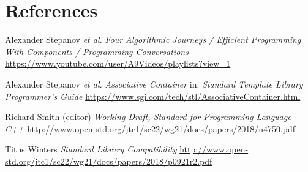 \documentclass[11pt]{article}
\begin{document}
\section{References}
\renewcommand{\section}[2]{}%
\begin{thebibliography}{9}
  Alexander Stepanov \emph{et al.}\newline
  \emph{Four Algorithmic Journeys / Efficient Programming With Components /
    Programming Conversations}\newline
  \url{https://www.youtube.com/user/A9Videos/playlists?view=1}

  Alexander Stepanov \emph{et al.}\newline
  \emph{Associative Container}\newline
  in: \emph{Standard Template Library Programmer's Guide}\newline
  \url{https://www.sgi.com/tech/stl/AssociativeContainer.html}

  Richard Smith (editor)\newline
  \emph{Working Draft, Standard for Programming Language C++}\newline
  \url{http://www.open-std.org/jtc1/sc22/wg21/docs/papers/2018/n4750.pdf}

 Titus Winters\newline
  \emph{Standard Library Compatibility}\newline
  \url{http://www.open-std.org/jtc1/sc22/wg21/docs/papers/2018/p0921r2.pdf}
\end{thebibliography}
\end{document}
